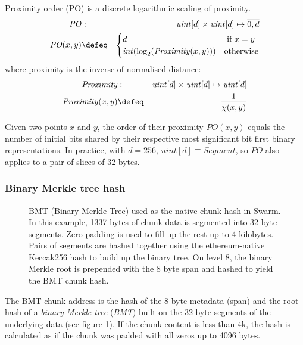 \begin{definition}
\label{def:xorPO}
Proximity order (PO) is a discrete logarithmic scaling of proximity.
%
\begin{eqnarray}
\mathit{PO}&:& \mathit{uint}[d] \times\mathit{uint}[d]\mapsto \overline{0,d}\\
\mathit{PO}(x,y) &\defeq &
\begin{cases}
d & \text{ if } x=y\\
\mathit{int}(\log_2(\mathit{Proximity}(x, y)))&\text{otherwise}\\
\end{cases}
\end{eqnarray}
%
where proximity is the inverse of normalised distance:
%
\begin{eqnarray}
\mathit{Proximity}&:& \mathit{uint}[d] \times\mathit{uint}[d]\mapsto \mathit{uint}[d]\\
\mathit{Proximity}(x, y) &\defeq & \frac{1}{\overline{\chi}(x,y)}
\end{eqnarray}

Given two points $x$ and $y$,  the order of their proximity $\mathit{PO}(x,y)$ equals the number of initial bits shared by their respective most significant bit first binary representations. In practice, with $d=256$,  $\mathit{uint}[d]\equiv\mathit{Segment}$, so $\mathit{PO}$ also applies to a pair of  slices of 32 bytes.
\end{definition}


\subsubsection{Binary Merkle tree hash}

\begin{figure}[!ht]
   \centering
   \resizebox{.85\textwidth}{!}{
   }
   \caption[BMT: Binary Merkle Tree hash]{BMT (Binary Merkle Tree) used as the native chunk hash in Swarm. In this example, 1337 bytes of chunk data is segmented into 32 byte segments. Zero padding is used to fill up the rest up to 4 kilobytes. Pairs of segments are hashed together using the ethereum-native Keccak256 hash to build up the binary tree. On level 8, the binary Merkle root is prepended with the 8 byte span and hashed to yield the BMT chunk hash.}
   \label{fig:BMT}
\end{figure}

The BMT chunk address is the hash of the 8 byte metadata (span) and the root hash of a \emph{binary Merkle tree} (\emph{BMT}) built on the 32-byte segments of the underlying data (see figure \ref{fig:BMT}). If the chunk content is less than 4k, the hash is calculated as if the chunk was padded with all zeros up to 4096 bytes.


